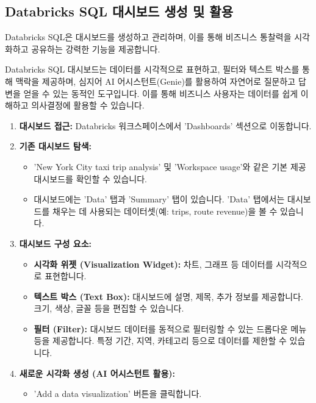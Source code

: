 \documentclass[11pt,a4paper]{article}
\begin{document}
\subsection{Databricks SQL 대시보드 생성 및 활용}
Databricks SQL은 대시보드를 생성하고 관리하며, 이를 통해 비즈니스 통찰력을 시각화하고 공유하는 강력한 기능을 제공합니다.

\begin{tcolorbox}[mybox={핵심 요약: 대시보드로 데이터 스토리텔링}]
Databricks SQL 대시보드는 데이터를 시각적으로 표현하고, 필터와 텍스트 박스를 통해 맥락을 제공하며, 심지어 AI 어시스턴트(Genie)를 활용하여 자연어로 질문하고 답변을 얻을 수 있는 동적인 도구입니다. 이를 통해 비즈니스 사용자는 데이터를 쉽게 이해하고 의사결정에 활용할 수 있습니다.
\end{tcolorbox}

\begin{enumerate}
    \item \textbf{대시보드 접근:} Databricks 워크스페이스에서 'Dashboards' 섹션으로 이동합니다.
    \item \textbf{기존 대시보드 탐색:}
    \begin{itemize}
        \item 'New York City taxi trip analysis' 및 'Workspace usage'와 같은 기본 제공 대시보드를 확인할 수 있습니다.
        \item 대시보드에는 'Data' 탭과 'Summary' 탭이 있습니다. 'Data' 탭에서는 대시보드를 채우는 데 사용되는 데이터셋(예: trips, route revenue)을 볼 수 있습니다.
    \end{itemize}
    \item \textbf{대시보드 구성 요소:}
    \begin{itemize}
        \item \textbf{시각화 위젯 (Visualization Widget):} 차트, 그래프 등 데이터를 시각적으로 표현합니다.
        \item \textbf{텍스트 박스 (Text Box):} 대시보드에 설명, 제목, 추가 정보를 제공합니다. 크기, 색상, 글꼴 등을 편집할 수 있습니다.
        \item \textbf{필터 (Filter):} 대시보드 데이터를 동적으로 필터링할 수 있는 드롭다운 메뉴 등을 제공합니다. 특정 기간, 지역, 카테고리 등으로 데이터를 제한할 수 있습니다.
    \end{itemize}
    \item \textbf{새로운 시각화 생성 (AI 어시스턴트 활용):}
    \begin{itemize}
        \item 'Add a data visualization' 버튼을 클릭합니다.

\end{itemize}
\end{enumerate}
\end{document}
